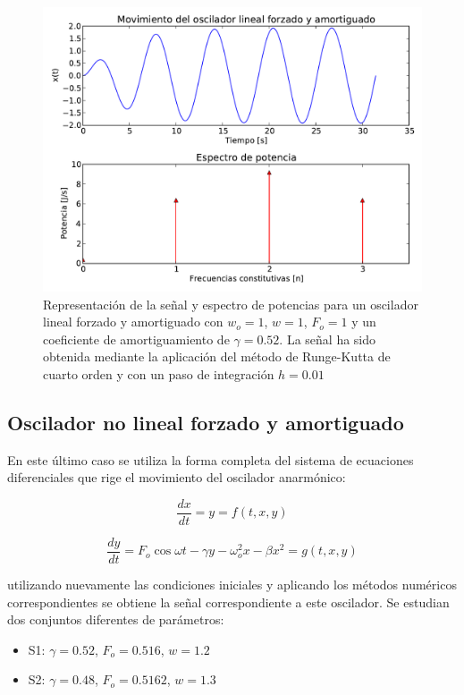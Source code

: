 \documentclass[11pt]{article}
\begin{document}
\begin{figure}
\centering
\includegraphics[width=0.75\linewidth]{caso_forzado_amortiguado.pdf}
\caption{Representación de la señal y espectro de potencias para un oscilador lineal forzado y amortiguado con $w_o = 1$, $w = 1$, $F_o = 1$ y un coeficiente de amortiguamiento de $\gamma = 0.52$. La señal ha sido obtenida mediante la aplicación del método de Runge-Kutta de cuarto orden y con un paso de integración $h = 0.01$}
\label{fig:caso_forzado_amortiguado}
\end{figure}

\subsection{Oscilador no lineal forzado y amortiguado}
En este último caso se utiliza la forma completa del sistema de ecuaciones diferenciales que rige el movimiento del oscilador anarmónico:

\begin{equation}
	\frac{dx}{dt} = y = f(t, x, y)
\end{equation}

\begin{equation}
	\frac{dy}{dt} = F_{o}\cos{\omega{}t} -\gamma{}y - \omega_{o}^2x - \beta{}x^2 = g(t, x, y) 	
\end{equation}

utilizando nuevamente las condiciones iniciales y aplicando los métodos numéricos correspondientes se obtiene la señal correspondiente a este oscilador. Se estudian dos conjuntos diferentes de parámetros:

\begin{itemize}
	\item S1: $\gamma = 0.52$, $F_o = 0.516$, $w = 1.2$
	\item S2: $\gamma = 0.48$, $F_o = 0.5162$, $w = 1.3$
\end{itemize}
\end{document}
